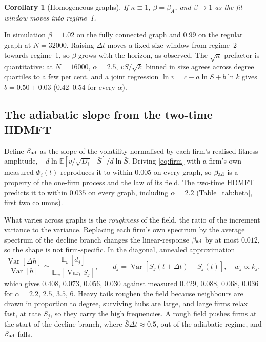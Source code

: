 \documentclass[11pt]{article}
\newcommand{\E}{\mathbb E}
\newcommand{\Var}{\operatorname{Var}}
\newcommand{\bad}{\beta_{\rm ad}}
\newtheorem{corollary}{Corollary}
\begin{document}
\begin{corollary}[Homogeneous graphs]\label{cor:homog}
If $\kappa\equiv1$, $\beta=\beta_A$, and $\beta\to1$ as the fit window moves into regime~1.
\end{corollary}
In simulation $\beta=1.02$ on the fully connected graph and $0.99$ on the regular graph at
$N=32000$.  Raising $\Delta t$ moves a fixed size window from regime~2 towards regime~1, so
$\beta$ grows with the horizon, as observed.  The $\sqrt\kappa$ prefactor is quantitative: at
$N=16000$, $\alpha=2.5$, $vS/\sqrt k$ binned in size agrees across degree quartiles to a few per
cent, and a joint regression $\ln v=c-a\ln S+b\ln k$ gives $b=0.50\pm0.03$ ($0.42$--$0.54$ for
every $\alpha$).

\subsection{The adiabatic slope from the two-time HDMFT}

Define $\bad$ as the slope of the volatility normalised by each firm's realised fitness
amplitude, $-d\ln\E[v/\sqrt{D_i}\mid\bar S]/d\ln\bar S$.  Driving \eqref{eq:firm} with a firm's own
measured $\Phi_i(t)$ reproduces it to within $0.005$ on every graph, so $\bad$ is a property of
the one-firm process and the law of its field.  The two-time HDMFT predicts it to within $0.035$
on every graph, including $\alpha=2.2$ (Table~\ref{tab:beta}, first two columns).

What varies across graphs is the \emph{roughness} of the field, the ratio of the increment
variance to the variance.  Replacing each firm's own spectrum by the average spectrum of the
decline branch changes the linear-response $\bad$ by at most $0.012$, so the shape is not
firm-specific.  In the diagonal, annealed approximation
\begin{equation}
  \frac{\Var[\Delta h]}{\Var[h]}\simeq\frac{\E_w[d_j]}{\E_w[\Var_tS_j]},\qquad
  d_j=\Var[S_j(t+\Delta t)-S_j(t)],\quad w_j\propto k_j ,
  \label{eq:rough}
\end{equation}
which gives $0.408$, $0.073$, $0.056$, $0.030$ against measured $0.429$, $0.088$, $0.068$, $0.036$
for $\alpha=2.2$, $2.5$, $3.5$, $6$.  Heavy tails roughen the field because neighbours are drawn in
proportion to degree, surviving hubs are large, and large firms relax fast, at rate $\bar S_j$, so
they carry the high frequencies.  A rough field pushes firms at the start of the decline branch,
where $\bar S\Delta t\approx0.5$, out of the adiabatic regime, and $\bad$ falls.
\end{document}
